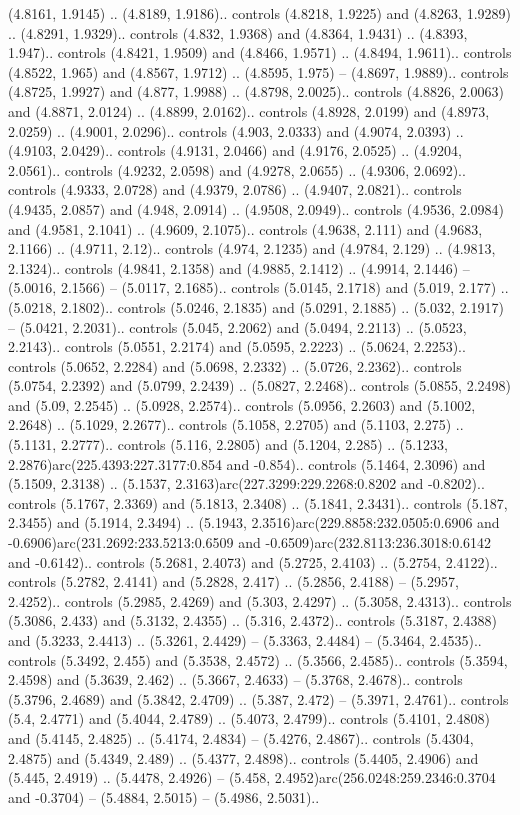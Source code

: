 (4.8161, 1.9145) .. (4.8189, 1.9186).. controls (4.8218, 1.9225) and (4.8263, 1.9289) .. (4.8291, 1.9329).. controls (4.832, 1.9368) and (4.8364, 1.9431) .. (4.8393, 1.947).. controls (4.8421, 1.9509) and (4.8466, 1.9571) .. (4.8494, 1.9611).. controls (4.8522, 1.965) and (4.8567, 1.9712) .. (4.8595, 1.975) -- (4.8697, 1.9889).. controls (4.8725, 1.9927) and (4.877, 1.9988) .. (4.8798, 2.0025).. controls (4.8826, 2.0063) and (4.8871, 2.0124) .. (4.8899, 2.0162).. controls (4.8928, 2.0199) and (4.8973, 2.0259) .. (4.9001, 2.0296).. controls (4.903, 2.0333) and (4.9074, 2.0393) .. (4.9103, 2.0429).. controls (4.9131, 2.0466) and (4.9176, 2.0525) .. (4.9204, 2.0561).. controls (4.9232, 2.0598) and (4.9278, 2.0655) .. (4.9306, 2.0692).. controls (4.9333, 2.0728) and (4.9379, 2.0786) .. (4.9407, 2.0821).. controls (4.9435, 2.0857) and (4.948, 2.0914) .. (4.9508, 2.0949).. controls (4.9536, 2.0984) and (4.9581, 2.1041) .. (4.9609, 2.1075).. controls (4.9638, 2.111) and (4.9683, 2.1166) .. (4.9711, 2.12).. controls (4.974, 2.1235) and (4.9784, 2.129) .. (4.9813, 2.1324).. controls (4.9841, 2.1358) and (4.9885, 2.1412) .. (4.9914, 2.1446) -- (5.0016, 2.1566) -- (5.0117, 2.1685).. controls (5.0145, 2.1718) and (5.019, 2.177) .. (5.0218, 2.1802).. controls (5.0246, 2.1835) and (5.0291, 2.1885) .. (5.032, 2.1917) -- (5.0421, 2.2031).. controls (5.045, 2.2062) and (5.0494, 2.2113) .. (5.0523, 2.2143).. controls (5.0551, 2.2174) and (5.0595, 2.2223) .. (5.0624, 2.2253).. controls (5.0652, 2.2284) and (5.0698, 2.2332) .. (5.0726, 2.2362).. controls (5.0754, 2.2392) and (5.0799, 2.2439) .. (5.0827, 2.2468).. controls (5.0855, 2.2498) and (5.09, 2.2545) .. (5.0928, 2.2574).. controls (5.0956, 2.2603) and (5.1002, 2.2648) .. (5.1029, 2.2677).. controls (5.1058, 2.2705) and (5.1103, 2.275) .. (5.1131, 2.2777).. controls (5.116, 2.2805) and (5.1204, 2.285) .. (5.1233, 2.2876)arc(225.4393:227.3177:0.854 and -0.854).. controls (5.1464, 2.3096) and (5.1509, 2.3138) .. (5.1537, 2.3163)arc(227.3299:229.2268:0.8202 and -0.8202).. controls (5.1767, 2.3369) and (5.1813, 2.3408) .. (5.1841, 2.3431).. controls (5.187, 2.3455) and (5.1914, 2.3494) .. (5.1943, 2.3516)arc(229.8858:232.0505:0.6906 and -0.6906)arc(231.2692:233.5213:0.6509 and -0.6509)arc(232.8113:236.3018:0.6142 and -0.6142).. controls (5.2681, 2.4073) and (5.2725, 2.4103) .. (5.2754, 2.4122).. controls (5.2782, 2.4141) and (5.2828, 2.417) .. (5.2856, 2.4188) -- (5.2957, 2.4252).. controls (5.2985, 2.4269) and (5.303, 2.4297) .. (5.3058, 2.4313).. controls (5.3086, 2.433) and (5.3132, 2.4355) .. (5.316, 2.4372).. controls (5.3187, 2.4388) and (5.3233, 2.4413) .. (5.3261, 2.4429) -- (5.3363, 2.4484) -- (5.3464, 2.4535).. controls (5.3492, 2.455) and (5.3538, 2.4572) .. (5.3566, 2.4585).. controls (5.3594, 2.4598) and (5.3639, 2.462) .. (5.3667, 2.4633) -- (5.3768, 2.4678).. controls (5.3796, 2.4689) and (5.3842, 2.4709) .. (5.387, 2.472) -- (5.3971, 2.4761).. controls (5.4, 2.4771) and (5.4044, 2.4789) .. (5.4073, 2.4799).. controls (5.4101, 2.4808) and (5.4145, 2.4825) .. (5.4174, 2.4834) -- (5.4276, 2.4867).. controls (5.4304, 2.4875) and (5.4349, 2.489) .. (5.4377, 2.4898).. controls (5.4405, 2.4906) and (5.445, 2.4919) .. (5.4478, 2.4926) -- (5.458, 2.4952)arc(256.0248:259.2346:0.3704 and -0.3704) -- (5.4884, 2.5015) -- (5.4986, 2.5031).. 